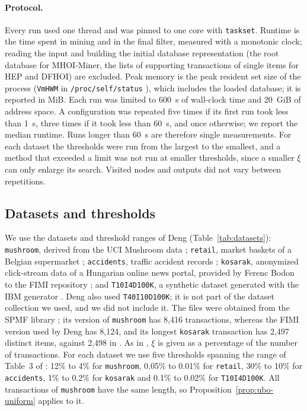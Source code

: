 \documentclass[pdflatex,sn-mathphys,Numbered]{sn-jnl}
\theoremstyle{thmstyleone}
\theoremstyle{thmstyletwo}
\theoremstyle{thmstylethree}
\newcommand{\Algo}{MHOI-Miner}
\begin{document}
\paragraph{Protocol.}
Every run used one thread and was pinned to one core with \texttt{taskset}. Runtime is the time spent in mining and in the final filter, measured with a monotonic clock; reading the input and building the initial database representation (the root database for \Algo{}, the lists of supporting transactions of single items for HEP and DFHOI) are excluded. Peak memory is the peak resident set size of the process (\texttt{VmHWM} in \texttt{/proc/self/status} \cite{linuxproc}), which includes the loaded database; it is reported in MiB. Each run was limited to 600~s of wall-clock time and 20~GiB of address space. A configuration was repeated five times if its first run took less than 1~s, three times if it took less than 60~s, and once otherwise; we report the median runtime. Runs longer than 60~s are therefore single measurements. For each dataset the thresholds were run from the largest to the smallest, and a method that exceeded a limit was not run at smaller thresholds, since a smaller $\xi$ can only enlarge its search. Visited nodes and outputs did not vary between repetitions.

\subsection{Datasets and thresholds}\label{sec:datasets}

We use the datasets and threshold ranges of Deng \cite[Section~4]{deng2020hoi} (Table~\ref{tab:datasets}): \texttt{mushroom}, derived from the UCI Mushroom data \cite{uci1981mushroom}; \texttt{retail}, market baskets of a Belgian supermarket \cite{brijs1999retail}; \texttt{accidents}, traffic accident records \cite{geurts2003accidents}; \texttt{kosarak}, anonymized click-stream data of a Hungarian online news portal, provided by Ferenc Bodon to the FIMI repository \cite{fimirepository}; and \texttt{T10I4D100K}, a synthetic dataset generated with the IBM generator \cite{agrawal1994fast}. Deng also used \texttt{T40I10D100K}; it is not part of the dataset collection we used, and we did not include it. The files were obtained from the SPMF library \cite{spmfdatasets,fournier2016spmf}; its version of \texttt{mushroom} has 8,416 transactions, whereas the FIMI version used by Deng has 8,124, and its longest \texttt{kosarak} transaction has 2,497 distinct items, against 2,498 in \cite[Table~2]{deng2020hoi}. As in \cite{deng2020hoi}, $\xi$ is given as a percentage of the number of transactions. For each dataset we use five thresholds spanning the range of Table~3 of \cite{deng2020hoi}: 12\% to 4\% for \texttt{mushroom}, 0.05\% to 0.01\% for \texttt{retail}, 30\% to 10\% for \texttt{accidents}, 1\% to 0.2\% for \texttt{kosarak} and 0.1\% to 0.02\% for \texttt{T10I4D100K}. All transactions of \texttt{mushroom} have the same length, so Proposition~\ref{prop:ubo-uniform} applies to it.
\end{document}
